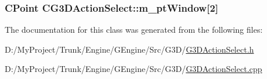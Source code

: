 \subsubsection[{m\+\_\+pt\+Window}]{\setlength{\rightskip}{0pt plus 5cm}C\+Point C\+G3\+D\+Action\+Select\+::m\+\_\+pt\+Window\mbox{[}2\mbox{]}\hspace{0.3cm}{\ttfamily [protected]}}\label{class_c_g3_d_action_select_a091eb4e40f0c6d6e2f0e70ed54c579ac}


The documentation for this class was generated from the following files\+:\begin{DoxyCompactItemize}
\item 
D\+:/\+My\+Project/\+Trunk/\+Engine/\+G\+Engine/\+Src/\+G3\+D/\hyperlink{_g3_d_action_select_8h}{G3\+D\+Action\+Select.\+h}\item 
D\+:/\+My\+Project/\+Trunk/\+Engine/\+G\+Engine/\+Src/\+G3\+D/\hyperlink{_g3_d_action_select_8cpp}{G3\+D\+Action\+Select.\+cpp}\end{DoxyCompactItemize}
